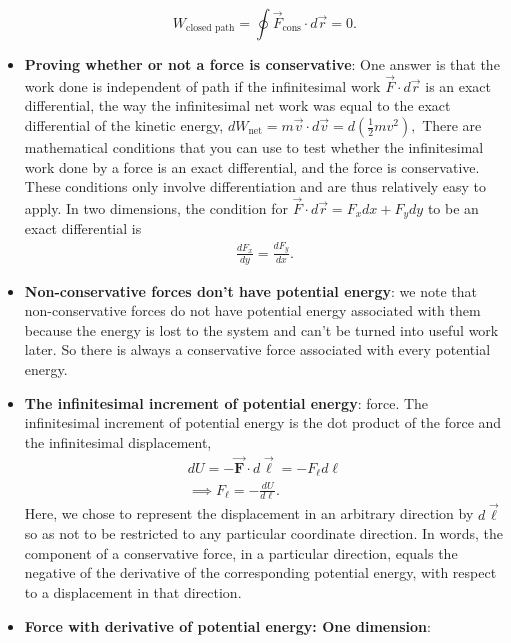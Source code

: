 \documentclass{report}
\begin{document}
\begin{itemize}
        \[
            W_{\text{closed path}} = \oint \vec{F}_{\text{cons}} \cdot d\vec{r} = 0.
        \]
        \item \textbf{Proving whether or not a force is conservative}:
            One answer is that the work done is independent of path if the infinitesimal work $\vec{F} \cdot d\vec{r}$ is an exact differential, the way the infinitesimal net work was equal to the exact differential of the kinetic energy, $dW_{\text{net}} = m\vec{v} \cdot d\vec{v} = d\left(\frac{1}{2}mv^2\right),$
            \bigbreak \noindent 
            There are mathematical conditions that you can use to test whether the infinitesimal work done by a force is an exact differential, and the force is conservative. These conditions only involve differentiation and are thus relatively easy to apply. In two dimensions, the condition for $\vec{F} \cdot d\vec{r} = F_x dx + F_y dy$ to be an exact differential is
            \begin{align*}
                \frac{dF_{x}}{dy} = \frac{dF_{y}}{dx}
            .\end{align*}
    \item \textbf{Non-conservative forces don't have potential energy}: we note that non-conservative forces do not have potential energy associated with them because the energy is lost to the system and can’t be turned into useful work later. So there is always a conservative force associated with every potential energy.
    \item \textbf{The infinitesimal increment of potential energy}:
        force. The infinitesimal increment of potential energy is the dot product of the force and the infinitesimal displacement,
        \begin{align*}
            dU = -\vec{\mathbf{F}} \cdot d\vec{\mathbf{\ell}} = -F_{\ell}d\ell \\
            \implies F_{\ell} = - \frac{dU}{d\ell}
        .\end{align*}
        \bigbreak \noindent 
        Here, we chose to represent the displacement in an arbitrary direction by  $d\vec{\mathbf{\ell}}$ so as not to be restricted to any particular coordinate direction.
        \bigbreak \noindent 
        In words, the component of a conservative force, in a particular direction, equals the negative of the derivative of the corresponding potential energy, with respect to a displacement in that direction.
    \item \textbf{Force with derivative of potential energy: One dimension}:
        \begin{align*}

\end{align*}
\end{itemize}
\end{document}
